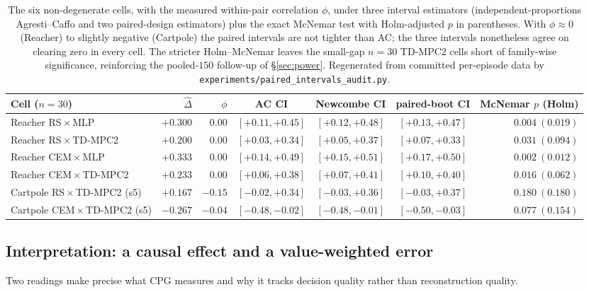 \documentclass[10pt,letterpaper]{article}
\begin{document}
\begin{table}[t]
\centering
\small
\setlength{\tabcolsep}{4pt}
\begin{tabular}{lrrcccr}
\toprule
Cell ($n=30$) & $\hat\Delta$ & $\phi$ & AC CI & Newcombe CI & paired-boot CI & McNemar $p$ (Holm) \\
\midrule
Reacher RS\,$\times$\,MLP          & $+0.300$ & $0.00$  & $[+0.11,+0.45]$ & $[+0.12,+0.48]$ & $[+0.13,+0.47]$ & $0.004\ (0.019)$ \\
Reacher RS\,$\times$\,TD-MPC2      & $+0.200$ & $0.00$  & $[+0.03,+0.34]$ & $[+0.05,+0.37]$ & $[+0.07,+0.33]$ & $0.031\ (0.094)$ \\
Reacher CEM\,$\times$\,MLP         & $+0.333$ & $0.00$  & $[+0.14,+0.49]$ & $[+0.15,+0.51]$ & $[+0.17,+0.50]$ & $0.002\ (0.012)$ \\
Reacher CEM\,$\times$\,TD-MPC2     & $+0.233$ & $0.00$  & $[+0.06,+0.38]$ & $[+0.07,+0.41]$ & $[+0.10,+0.40]$ & $0.016\ (0.062)$ \\
Cartpole RS\,$\times$\,TD-MPC2 (s5)  & $+0.167$ & $-0.15$ & $[-0.02,+0.34]$ & $[-0.03,+0.36]$ & $[-0.03,+0.37]$ & $0.180\ (0.180)$ \\
Cartpole CEM\,$\times$\,TD-MPC2 (s5) & $-0.267$ & $-0.04$ & $[-0.48,-0.02]$ & $[-0.48,-0.01]$ & $[-0.50,-0.03]$ & $0.077\ (0.154)$ \\
\bottomrule
\end{tabular}
\caption{The six non-degenerate cells, with the measured within-pair correlation $\phi$, under three interval estimators (independent-proportions Agresti--Caffo and two paired-design estimators) plus the exact McNemar test with Holm-adjusted $p$ in parentheses. With $\phi \approx 0$ (Reacher) to slightly negative (Cartpole) the paired intervals are not tighter than AC; the three intervals nonetheless agree on clearing zero in every cell. The stricter Holm--McNemar leaves the small-gap $n=30$ TD-MPC2 cells short of family-wise significance, reinforcing the pooled-$150$ follow-up of \S\ref{sec:power}. Regenerated from committed per-episode data by \texttt{experiments/paired\_intervals\_audit.py}.}
\label{tab:paired}
\end{table}

\subsection{Interpretation: a causal effect and a value-weighted error}
\label{sec:interpretation}

Two readings make precise what CPG measures and why it tracks decision quality rather than reconstruction quality.
\end{document}
